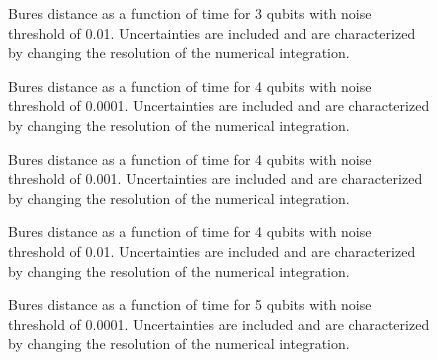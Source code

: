 \pagebreak

\begin{figure}
\begin{center}
\end{center}
\caption{Bures distance as a function of time for 3 qubits with noise
threshold of 0.01.  Uncertainties are included and are characterized 
by changing the resolution of the numerical integration.}
\end{figure}

\pagebreak

\begin{figure}
\begin{center}
\end{center}
\caption{Bures distance as a function of time for 4 qubits with noise
threshold of 0.0001.  Uncertainties are included and are characterized 
by changing the resolution of the numerical integration.}
\end{figure}

\pagebreak

\begin{figure}
\begin{center}
\end{center}
\caption{Bures distance as a function of time for 4 qubits with noise
threshold of 0.001.  Uncertainties are included and are characterized 
by changing the resolution of the numerical integration.}
\end{figure}

\pagebreak

\begin{figure}
\begin{center}
\end{center}
\caption{Bures distance as a function of time for 4 qubits with noise
threshold of 0.01.  Uncertainties are included and are characterized 
by changing the resolution of the numerical integration.}
\end{figure}

\pagebreak

\begin{figure}
\begin{center}
\end{center}
\caption{Bures distance as a function of time for 5 qubits with noise
threshold of 0.0001.  Uncertainties are included and are characterized 
by changing the resolution of the numerical integration.}
\end{figure}


